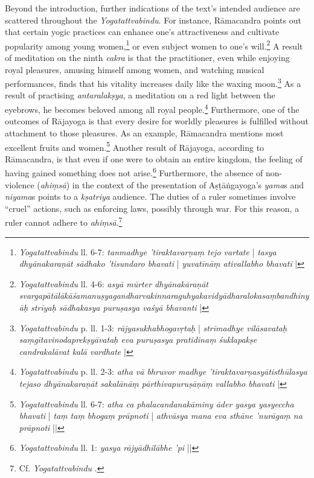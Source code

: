 Beyond the introduction, further indications of the text's intended audience are scattered throughout the \emph{Yogatattvabindu}. For instance, Rāmacandra points out that certain yogic practices can enhance one's attractiveness and cultivate popularity among young women,\footnote{\emph{Yogatattvabindu}  ll. 6-7: \textit{tanmadhye 'tiraktavarṇaṃ tejo vartate} | \textit{tasya dhyānakaraṇāt sādhako 'tisundaro bhavati} | \textit{yuvatīnāṃ ativallabho bhavati} |} or even subject women to one's will.\footnote{\emph{Yogatattvabindu}  \pageref{womenobey} ll. 4-6: \textit{asyā mūrter dhyānakāraṇāt svargapātālākāśamanuṣyagandharvakinnaraguhyakavidyādharalokasaṃbandhinyāḥ strīyaḥ sādhakasya puruṣasya vaśyā bhavanti} |} A result of meditation on the ninth \textit{cakra} is that the practitioner, even while enjoying royal pleasures, amusing himself among women, and watching musical performances, finds that his vitality increases daily like the waxing moon.\footnote{\emph{Yogatattvabindu}  p.\pageref{cakra9kala} ll. 1-3: \textit{rājyasukhabhogavṛtaḥ} | \textit{strīmadhye vilāsavataḥ saṃgītavinodaprekṣyāvataḥ eva puruṣasya pratidinaṃ śuklapakṣe candrakalāvat kalā vardhate} |} As a result of practising \textit{antaralakṣya}, a meditation on a red light between the eyebrows, he becomes beloved among all royal people.\footnote{\emph{Yogatattvabindu}  p.\pageref{royalpeople} ll. 2-3: \textit{atha vā bhruvor madhye 'tiraktavarṇasyātisthūlasya tejaso dhyānakaraṇāt sakalānāṃ pārthivapuruṣāṇāṃ vallabho bhavati} |} Furthermore, one of the outcomes of Rājayoga is that every desire for worldly pleasures is fulfilled without attachment to those pleasures. As an example, Rāmacandra mentions most excellent fruits and women.\footnote{\emph{Yogatattvabindu}  ll. 6-7: \textit{atha ca phalacandanakāminy āder yasya yasyeccha bhavati} | \textit{taṃ taṃ bhogaṃ prāpnoti} | \textit{athvāsya mana eva sthāne 'nurāgaṃ na prāpnoti} ||} Another result of Rājayoga, according to Rāmacandra, is that even if one were to obtain an entire kingdom, the feeling of having gained something does not arise.\footnote{\emph{Yogatattvabindu}  ll. 1: \textit{yasya rājyādhilābhe 'pi } ||} Furthermore, the absence of non-violence (\textit{ahiṃsā}) in the context of the presentation of Aṣṭāṅgayoga's \textit{yama}s and \textit{niyama}s points to a \textit{kṣatriya} audience. The duties of a ruler sometimes involve ``cruel'' actions, such as enforcing laws, possibly through war. For this reason, a ruler cannot adhere to \textit{ahiṃsā}.\footnote{Cf. \emph{Yogatattvabindu} .}

